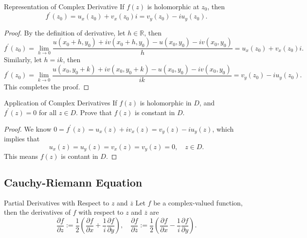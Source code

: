 \begin{proposition}{Representation of Complex Derivative}{}
  If $f(z)$ is holomorphic at $z_0$, then
  \begin{equation}
    f^{\prime}(z_0) = u_x(z_0) + v_x(z_0) i = v_y(z_0) - iu_y(z_0).
  \end{equation}
\end{proposition}

\begin{proof}
  By the definition of derivative, let $h \in \mathbb{R}$, then
  \begin{equation}
    f^{\prime}(z_0) = \lim \limits _{h \rightarrow 0} \frac{u(x_0+h, y_0) + i v(x_0 + h, y_0) - u(x_0, y_0) - iv(x_0, y_0)}{h}
    = u_x(z_0) + v_x(z_0)i.
  \end{equation}
  Similarly, let $h = ik$, then
  \begin{equation}
    f^{\prime}(z_0) = \lim \limits _{k \rightarrow 0} \frac{u(x_0,y_0+k) + i v(x_0, y_0 + k) - u(x_0,y_0) - iv(x_0,y_0)}{ik}
    = v_y(z_0) - iu_y(z_0).
  \end{equation}
  This completes the proof.
\end{proof}

\begin{example}{Application of Complex Derivatives}{}
  If $f(z)$ is holomorphic in $D$, and $f^{\prime}(z) = 0$ for all $z \in D$.
  Prove that $f(z)$ is constant in $D$.
\end{example}

\begin{proof}
  We know $0 = f^{\prime}(z) = u_x(z)+iv_x(z) = v_y(z)-iu_y(z)$,
  which implies that
  \begin{equation}
    u_x(z) = u_y(z) = v_x(z) = v_y(z) = 0, \quad z \in D.
  \end{equation}
  This means $f(z)$ is contant in $D$.
\end{proof}

\subsection{Cauchy-Riemann Equation}

\begin{definition}{Partial Derivatives with Respect to $z$ and $\overline{z}$}{}
  Let $f$ be a complex-valued function,
  then the derivatives of $f$ with respect to $z$ and $\overline{z}$ are
  \begin{equation}
    \frac{\partial f}{\partial z} := \frac{1}{2} \left( \frac{\partial f}{\partial x} + \frac{1}{i} \frac{\partial f}{\partial y} \right), \quad
    \frac{\partial f}{\partial \overline{z}} := \frac{1}{2} \left( \frac{\partial f}{\partial x} - \frac{1}{i} \frac{\partial f}{\partial y} \right).
  \end{equation}
\end{definition}


